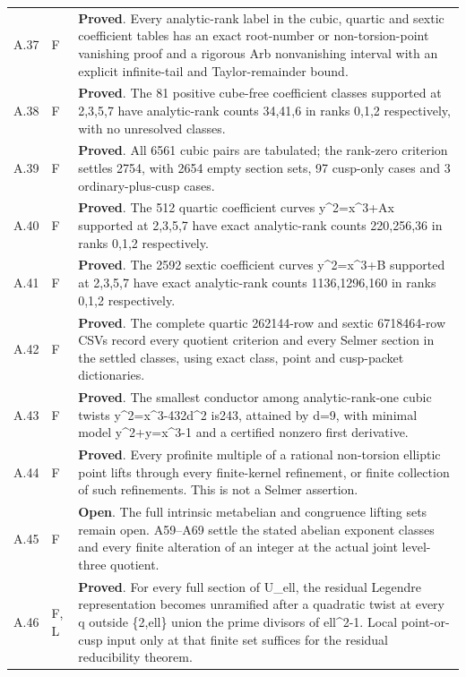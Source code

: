 \begin{longtable}{@{}p{}p{}p{}@{}}
A.37 & F & \textbf{Proved}. Every analytic-rank label in the cubic, quartic and sextic coefficient tables has an exact root-number or non-torsion-point vanishing proof and a rigorous Arb nonvanishing interval with an explicit infinite-tail and Taylor-remainder bound. \\
A.38 & F & \textbf{Proved}. The 81 positive cube-free coefficient classes supported at 2,3,5,7 have analytic-rank counts 34,41,6 in ranks 0,1,2 respectively, with no unresolved classes. \\
A.39 & F & \textbf{Proved}. All 6561 cubic pairs are tabulated; the rank-zero criterion settles 2754, with 2654 empty section sets, 97 cusp-only cases and 3 ordinary-plus-cusp cases. \\
A.40 & F & \textbf{Proved}. The 512 quartic coefficient curves y\textasciicircum{}2=x\textasciicircum{}3+Ax supported at 2,3,5,7 have exact analytic-rank counts 220,256,36 in ranks 0,1,2 respectively. \\
A.41 & F & \textbf{Proved}. The 2592 sextic coefficient curves y\textasciicircum{}2=x\textasciicircum{}3+B supported at 2,3,5,7 have exact analytic-rank counts 1136,1296,160 in ranks 0,1,2 respectively. \\
A.42 & F & \textbf{Proved}. The complete quartic 262144-row and sextic 6718464-row CSVs record every quotient criterion and every Selmer section in the settled classes, using exact class, point and cusp-packet dictionaries. \\
A.43 & F & \textbf{Proved}. The smallest conductor among analytic-rank-one cubic twists y\textasciicircum{}2=x\textasciicircum{}3-432d\textasciicircum{}2 is243, attained by d=9, with minimal model y\textasciicircum{}2+y=x\textasciicircum{}3-1 and a certified nonzero first derivative. \\
A.44 & F & \textbf{Proved}. Every profinite multiple of a rational non-torsion elliptic point lifts through every finite-kernel refinement, or finite collection of such refinements. This is not a Selmer assertion. \\
A.45 & F & \textbf{Open}. The full intrinsic metabelian and congruence lifting sets remain open. A59--A69 settle the stated abelian exponent classes and every finite alteration of an integer at the actual joint level-three quotient. \\
A.46 & F, L & \textbf{Proved}. For every full section of U\_ell, the residual Legendre representation becomes unramified after a quadratic twist at every q outside \{2,ell\} union the prime divisors of ell\textasciicircum{}2-1. Local point-or-cusp input only at that finite set suffices for the residual reducibility theorem. \\

\end{longtable}
